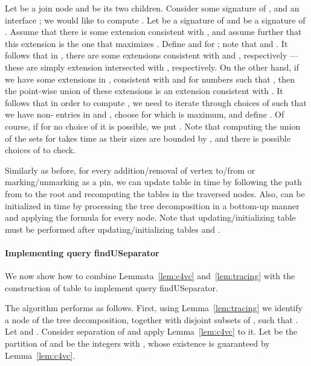 \documentclass[a4paper,11pt]{article}
\theoremstyle{definition}
\theoremstyle{remark}
\newcommand{\qUsep}{\textnormal{findUSeparator}}
\begin{document}
\vskip 0.3cm

 Let  be a join node and
 be its two children.  Consider some signature
 of , and an interface ; we would
like to compute .  Let
 be a signature of  and 
be a signature of .  Assume that there is some extension
 consistent with , and assume
further that this extension is the one that maximizes .  Define  and  for
; note that  and .  It follows that in
,  there are some extensions consistent with
 and , respectively --- these are simply
extension  intersected with ,
respectively.  On the other hand, if we have some extensions in
,  consistent with  and 
for numbers  such that , then the point-wise union of
these extensions is an extension consistent with .  It
follows that in order to compute , we need to iterate
through choices of  such that we have non- entries in
 and
, choose
 for which  is maximum, and
define .  Of course, if for no choice of  it is
possible, we put .  Note that computing the union of
the sets  for  takes  time as their sizes
are bounded by , and there is  possible choices of  to
check.

\vskip 0.3cm

Similarly as before, for every addition/removal of vertex  to/from
 or marking/unmarking  as a pin, we can update table  in
 time by following the path from
 to the root and recomputing the tables in the traversed nodes.
Also,  can be initialized in  time
by processing the tree decomposition in a bottom-up manner and
applying the formula for every node.  Note that updating/initializing
table  must be performed after updating/initializing tables 
and .

\paragraph{Implementing query \qUsep}
We now show how to combine Lemmata~\ref{lem:c4vc}
and~\ref{lem:tracing} with the construction of table  to
implement query \qUsep.

The algorithm performs as follows.  First, using
Lemma~\ref{lem:tracing} we identify a node  of the tree
decomposition, together with disjoint subsets
 of , such
that .  Let  and
.  Consider separation  of  and apply Lemma~\ref{lem:c4vc}
to it.  Let  be the partition of  and
 be the integers with , whose
existence is guaranteed by Lemma~\ref{lem:c4vc}.
\end{document}
